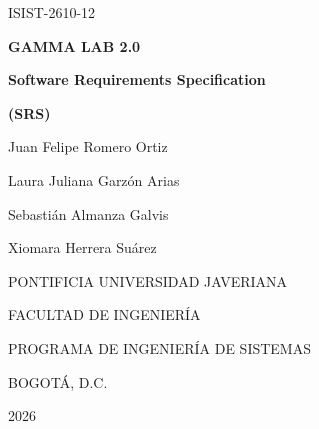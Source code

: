 \documentclass[12pt, letterpaper]{article}
\begin{document}
\providecommand{\tituloProyecto}{GAMMA LAB 2.0}
\providecommand{\grupo}{ISIST-2610-12}
\providecommand{\autorUno}{Juan Felipe Romero Ortiz}
\providecommand{\autorDos}{Laura Juliana Garzón Arias}
\providecommand{\autorTres}{Sebastián Almanza Galvis}
\providecommand{\autorCuatro}{Xiomara Herrera Suárez}
\providecommand{\leyendaGrado}{MEMORIA DE PROYECTO DE GRADO REALIZADO PARA CUMPLIR UNO DE
LOS REQUISITOS PARA EL TÍTULO EN INGENIERÍA DE SISTEMAS}
\providecommand{\director}{Ing. Cécile Gauthier Umaña}
\providecommand{\juradoUno}{Ing. Leonardo Flórez}
\providecommand{\juradoDos}{Ing. Alexander Caicedo}
\providecommand{\universidad}{PONTIFICIA UNIVERSIDAD JAVERIANA}
\providecommand{\universidadNombre}{Pontificia Universidad Javeriana}
\providecommand{\facultad}{FACULTAD DE INGENIERÍA}
\providecommand{\programa}{PROGRAMA DE INGENIERÍA DE SISTEMAS}
\providecommand{\ciudad}{BOGOTÁ, D.C.}
\providecommand{\anio}{2026}
\providecommand{\fechaLarga}{Noviembre, 2026}
\providecommand{\rector}{P. Luis Fernando Múnera Congote, S.J.}
\providecommand{\decano}{Ing. Diego Alejandro Patiño Guevara, Ph.D.}
\providecommand{\directorDepto}{Ing. César Julio Bustacara Medina, Ph.D.}
\providecommand{\directorCarrera}{Ing. Andrea del Pilar Rueda Olarte}

\begingroup\setlength{\parskip}{0pt}%

\thispagestyle{empty}
\begin{center}
  \vspace*{1cm}
  {\large \grupo}\par\vspace{1.2cm}
  {\LARGE\bfseries \tituloProyecto}\par\vspace{1cm}
  {\Large\bfseries Software Requirements Specification}\par\vspace{0.3cm}
  {\large\bfseries (SRS)}\par\vspace{2cm}
  \autorUno\par
  \autorDos\par
  \autorTres\par
  \autorCuatro\par
  \vfill
  \universidad\par
  \facultad\par
  \programa\par
  \ciudad\par
  \anio\par
  \vspace{1cm}
\end{center}
\clearpage
\end{document}
